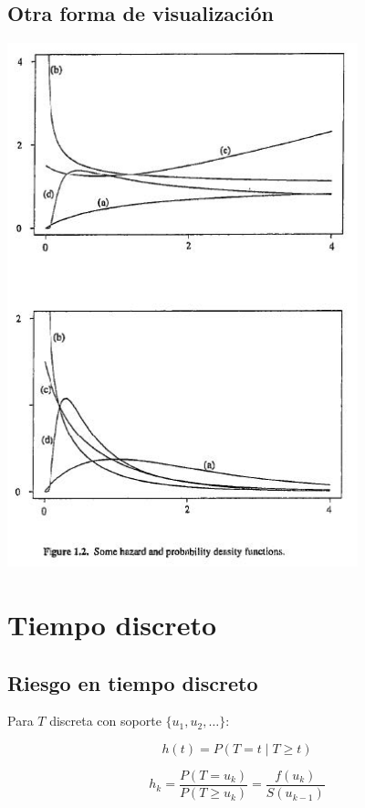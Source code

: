 \documentclass[
  letterpaper,
  DIV=11,
  numbers=noendperiod]{scrartcl}
\begin{document}
\subsection{Otra forma de
visualización}\label{otra-forma-de-visualizaciuxf3n}

\begin{center}
\includegraphics[width=4in,height=\textheight,keepaspectratio]{figura/ejempRiesgoContinuo2.jpg}
\end{center}

\section{Tiempo discreto}\label{tiempo-discreto}

\subsection{Riesgo en tiempo discreto}\label{riesgo-en-tiempo-discreto}

Para \(T\) discreta con soporte \(\{u_1, u_2, \dots\}\):

\[
h(t) = P(T = t \mid T \ge t)
\]

\[
h_k = \frac{P(T = u_k)}{P(T \ge u_k)} = \frac{f(u_k)}{S(u_{k-1})}
\]
\end{document}
